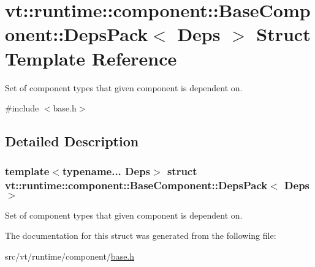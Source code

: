\hypertarget{structvt_1_1runtime_1_1component_1_1_base_component_1_1_deps_pack}{}\section{vt\+:\+:runtime\+:\+:component\+:\+:Base\+Component\+:\+:Deps\+Pack$<$ Deps $>$ Struct Template Reference}
\label{structvt_1_1runtime_1_1component_1_1_base_component_1_1_deps_pack}


Set of component types that given component is dependent on.  




{\ttfamily \#include $<$base.\+h$>$}



\subsection{Detailed Description}
\subsubsection*{template$<$typename... Deps$>$\newline
struct vt\+::runtime\+::component\+::\+Base\+Component\+::\+Deps\+Pack$<$ Deps $>$}

Set of component types that given component is dependent on. 

The documentation for this struct was generated from the following file\+:\begin{DoxyCompactItemize}
\item 
src/vt/runtime/component/\hyperlink{src_2vt_2runtime_2component_2base_8h}{base.\+h}\end{DoxyCompactItemize}
